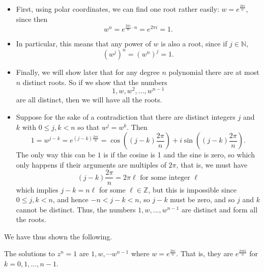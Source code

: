 \documentclass[11pt,dvipsnames]{book}
\numberwithin{figure}{section} %
\numberwithin{table}{section} %
\begin{document}
\begin{itemize}
\item First, using polar coordinates, we can find one root rather easily: $w=e^{\frac{2\pi i}{n}}$, since then
\[
w^{n} = e^{\frac{2\pi i}{n}\cdot n}=e^{2\pi i}=1.\]
\item In particular, this means that any power of $w$ is also a root, since if $j\in\mathbb{N}$,
\[
(w^{j} )^{n} = (w^{n})^{j}=1.
\]
\item Finally, we will show later that for any degree $n$ polynomial there are at most $n$ distinct roots. So if we show that the numbers
\[
1,w,w^{2},...,w^{n-1}
\]
are all distinct, then we will have all the roots. \\

\item Suppose for the sake of a contradiction that there are distinct integers $j$ and $k$ with $0\leq j,k<n$ so that $w^{j}=w^{k}$. Then
\[
1=w^{j-k}=e^{(j-k)\frac{2\pi i}{n}} = \cos \left((j-k)\frac{2\pi }{n}\right)+i\sin \left((j-k)\frac{2\pi }{n}\right).\]
The only way this can be $1$ is if the cosine is 1 and the sine is zero, so which only happens if their arguments are multiples of $2\pi$, that is, we must have
\[
(j-k)\frac{2\pi }{n} = 2\pi \ell \mbox{ for some integer }\ell\]
which implies $j-k=n\ell$ for some $\ell\in\mathbb{Z}$, but this is impossible since $0\leq j,k<n$, and hence $-n<j-k<n$, so $j-k$ must be zero, and so $j$ and $k$ cannot be distinct. Thus, the numbers $1,w,...,w^{n-1}$ are distinct and form all the roots.
\end{itemize}

We have thus shown the following.

\begin{theorem}
The solutions to $z^{n}=1$ are $1,w,\cdots w^{n-1}$ where $w=e^{\frac{2\pi i}{n}}$. That is, they are $e^{\frac{2\pi k i}{n}}$ for $k=0,1,...,n-1$.
\end{theorem}
\end{document}
